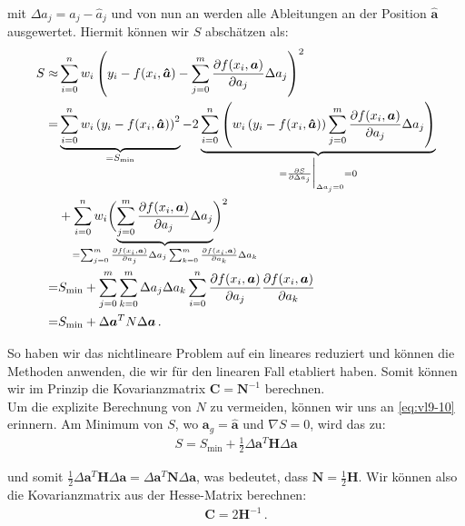 mit $\Delta a_j = a_j - \hat{a}_j$ und von nun an werden alle Ableitungen an der Position $\boldsymbol{\hat{a}}$ ausgewertet. Hiermit k\"onnen wir $S$ absch\"atzen als:
\begin{align}
\begin{split}
S \approx& \sum_{i=0}^n w_i \left( y_i - f(x_i, \boldsymbol{\hat{a}}) - \sum_{j=0}^m \frac{ \partial f(x_i, \boldsymbol{a}) }{ \partial a_j } \Delta a_j \right)^2\\
=& \underbrace{\sum_{i=0}^n w_i \left( y_i - f(x_i, \boldsymbol{\hat{a}}) \right)^2}_{= S_\text{min}} - 2 \underbrace{\sum_{i=0}^n \left( w_i \left( y_i - f(x_i, \boldsymbol{\hat{a}}) \right) \sum_{j=0}^m \frac{ \partial f(x_i, \boldsymbol{a}) }{ \partial a_j } \Delta a_j \right)}_{= \frac{ \partial S }{ \partial \Delta a_j} \bigg|_{\Delta a_j = 0} = 0}\\
&+ \sum_{i=0}^n w_i \biggl( {\underbrace{\sum_{j=0}^m \frac{ \partial f(x_i, \boldsymbol{a}) }{ \partial a_j } \Delta a_j}_{\mathclap{= \sum_{j=0}^m \frac{ \partial f(x_i, \boldsymbol{a}) }{ \partial a_j } \Delta a_j \sum_{k=0}^m \frac{ \partial f(x_i, \boldsymbol{a}) }{ \partial a_k } \Delta a_k}}} \biggr)^2\\
=& S_\text{min} + \sum_{j=0}^m \sum_{k=0}^m \Delta a_j \Delta a_k \sum_{i=0}^n \frac{ \partial f(x_i, \boldsymbol{a}) }{ \partial a_j } \frac{ \partial f(x_i, \boldsymbol{a}) }{ \partial a_k }\\
=& S_\text{min} + \Delta \boldsymbol{a}^T N \Delta \boldsymbol{a}\,.
\label{eq:vl9-21}
\end{split}
\end{align}

So haben wir das nichtlineare Problem auf ein lineares reduziert und k\"onnen die Methoden anwenden, die wir f\"ur den linearen Fall etabliert haben. Somit k\"onnen wir im Prinzip die Kovarianzmatrix $\boldsymbol{C} = \boldsymbol{N}^{-1}$ berechnen.\\[0.3cm]
Um die explizite Berechnung von $N$ zu vermeiden, k\"onnen wir uns an \cref{eq:vl9-10} erinnern. Am Minimum von $S$, wo $\boldsymbol{a}_g = \boldsymbol{\hat{a}}$ und $\nabla S = 0$, wird das zu:
\begin{align}
S = S_\text{min} + \frac{1}{2} \Delta \boldsymbol{a}^T \boldsymbol{H} \Delta \boldsymbol{a}
\label{eq:vl9-22}
\end{align}

und somit $\frac{1}{2} \Delta \boldsymbol{a}^T \boldsymbol{H} \Delta \boldsymbol{a} = \Delta \boldsymbol{a}^T \boldsymbol{N} \Delta \boldsymbol{a}$, was bedeutet, dass $\boldsymbol{N} = \frac{1}{2} \boldsymbol{H}$. Wir k\"onnen also die Kovarianzmatrix aus der Hesse-Matrix berechnen:
\begin{align}
\boldsymbol{C} = 2 \boldsymbol{H}^{-1}\,.
\label{eq:vl9-23}
\end{align}

